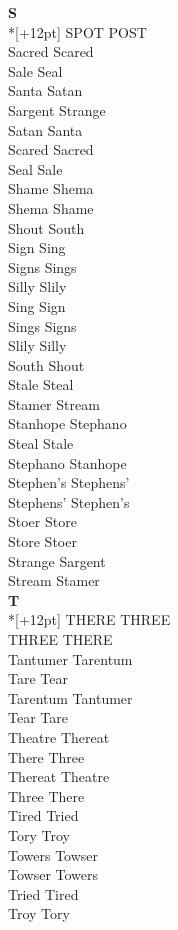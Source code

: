 \vspace{14pt}
\noindent\textbf{\Large S}\\*[+12pt]
SPOT POST\\
Sacred Scared\\
Sale Seal\\
Santa Satan\\
Sargent Strange\\
Satan Santa\\
Scared Sacred\\
Seal Sale\\
Shame Shema\\
Shema Shame\\
Shout South\\
Sign Sing\\
Signs Sings\\
Silly Slily\\
Sing Sign\\
Sings Signs\\
Slily Silly\\
South Shout\\
Stale Steal\\
Stamer Stream\\
Stanhope Stephano\\
Steal Stale\\
Stephano Stanhope\\
Stephen's Stephens'\\
Stephens' Stephen's\\
Stoer Store\\
Store Stoer\\
Strange Sargent\\
Stream Stamer\\

\vspace{14pt}
\noindent\textbf{\Large T}\\*[+12pt]
THERE THREE\\
THREE THERE\\
Tantumer Tarentum\\
Tare Tear\\
Tarentum Tantumer\\
Tear Tare\\
Theatre Thereat\\
There Three\\
Thereat Theatre\\
Three There\\
Tired Tried\\
Tory Troy\\
Towers Towser\\
Towser Towers\\
Tried Tired\\
Troy Tory\\

